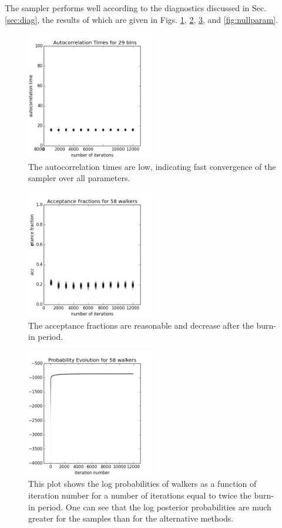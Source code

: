 \documentclass[preprint]{aastex}
\begin{document}
The sampler performs well according to the diagnostics discussed in Sec. \ref{sec:diag}, the results of which are given in Figs. \ref{fig:nullacor}, \ref{fig:nullfrac}, \ref{fig:nullprob}, and \ref{fig:nullparam}.  

\begin{figure}
\includegraphics[width=0.5\textwidth]{times-real.png}
\caption{The autocorrelation times are low, indicating fast convergence of the sampler over all parameters.}
\label{fig:nullacor}
\end{figure}

\begin{figure}
\includegraphics[width=0.5\textwidth]{fracs-real.png}
\caption{The acceptance fractions are reasonable and decrease after the burn-in period.}
\label{fig:nullfrac}
\end{figure}

\begin{figure}
\includegraphics[width=0.5\textwidth]{probs-real.png}
\caption{This plot shows the log probabilities of walkers as a function of iteration number for a number of iterations equal to twice the burn-in period.  One can see that the log posterior probabilities are much greater for the samples than for the alternative methods.}
\label{fig:nullprob}
\end{figure}
\end{document}
